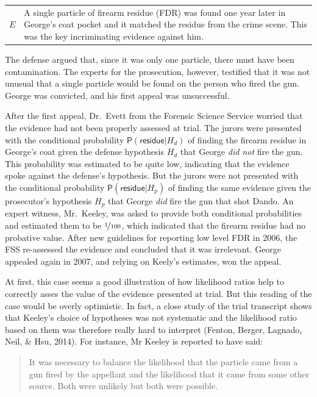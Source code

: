 \documentclass[
  10pt,
  dvipsnames,enabledeprecatedfontcommands]{scrartcl}
\newcommand{\pr}[1]{\mathsf{P}(#1)}
\begin{document}
\begin{center}
\begin{tabular}{lp{12cm}} 
    $E$ &  
    A single particle of firearm  residue (FDR) 
     was found one year later in George's coat pocket and it matched the residue from the crime scene.
     This was the key incriminating evidence against him. 
\end{tabular}
\end{center}
\vspace{2mm}

\noindent  The defense argued that, since it was only one particle,
there must have been contamination. The experts for the prosecution,
however, testified that it was not unusual that a single particle would
be found on the person who fired the gun. George was convicted, and his
first appeal was unsuccessful.

After the first appeal, Dr.~Evett from the Forensic Science Service
worried that the evidence had not been properly assessed at trial. The
jurors were presented with the conditional probability
\(\pr{\textsf{residue}\vert H_d}\) of finding the firearm residue in
George's coat given the defense hypothesis \(H_d\) that George
\textit{did not} fire the gun. This probability was estimated to be
quite low, indicating that the evidence spoke against the defense's
hypothesis. But the jurors were not presented with the conditional
probability \(\pr{\textsf{residue}\vert H_p}\) of finding the same
evidence given the prosecutor's hypothesis \(H_p\) that George
\textit{did} fire the gun that shot Dando. An expert witness,
Mr.~Keeley, was asked to provide both conditional probabilities and
estimated them to be \(\nicefrac{1}{100}\), which indicated that the
firearm residue had no probative value. After new guidelines for
reporting low level FDR in 2006, the FSS re-assessed the evidence and
concluded that it was irrelevant. George appealed again in 2007, and
relying on Keely's estimates, won the appeal.

At first, this case seems a good illustration of how likelihood ratios
help to correctly asses the value of the evidence presented at trial.
But this reading of the case would be overly optimistic. In fact, a
close study of the trial transcript shows that Keeley's choice of
hypotheses was not systematic and the likelihood ratio based on them was
therefore really hard to interpret (Fenton, Berger, Lagnado, Neil, \&
Hsu, 2014). For instance, Mr Keeley is reported to have said:

\begin{quote}
    It was necessary to balance the likelihood that the particle came from a gun fired by the appellant and the likelihood that it came from some other source. Both were unlikely but both were possible.
\end{quote}
\end{document}
